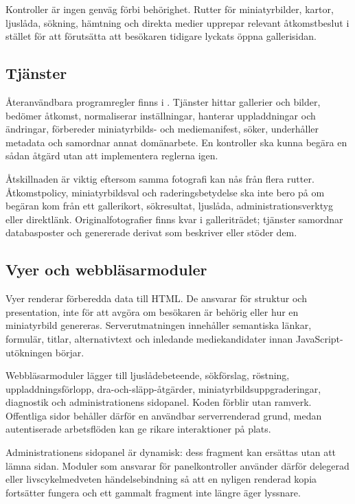\documentclass[11pt,a4paper]{article}
\newcommand{\filepath}[1]{\path{#1}}
\begin{document}
Kontroller är ingen genväg förbi behörighet. Rutter för miniatyrbilder, kartor,
ljuslåda, sökning, hämtning och direkta medier upprepar relevant åtkomstbeslut i
stället för att förutsätta att besökaren tidigare lyckats öppna gallerisidan.

\subsection{Tjänster}

Återanvändbara programregler finns i \filepath{app/services/}. Tjänster hittar
gallerier och bilder, bedömer åtkomst, normaliserar inställningar, hanterar
uppladdningar och ändringar, förbereder miniatyrbilds- och mediemanifest, söker,
underhåller metadata och samordnar annat domänarbete. En kontroller ska kunna
begära en sådan åtgärd utan att implementera reglerna igen.

Åtskillnaden är viktig eftersom samma fotografi kan nås från flera rutter.
Åtkomstpolicy, miniatyrbildsval och raderingsbetydelse ska inte bero på om
begäran kom från ett gallerikort, sökresultat, ljuslåda, administrationsverktyg
eller direktlänk. Originalfotografier finns kvar i galleriträdet; tjänster
samordnar databasposter och genererade derivat som beskriver eller stöder dem.

\subsection{Vyer och webbläsarmoduler}

Vyer renderar förberedda data till HTML. De ansvarar för struktur och
presentation, inte för att avgöra om besökaren är behörig eller hur en
miniatyrbild genereras. Serverutmatningen innehåller semantiska länkar,
formulär, titlar, alternativtext och inledande mediekandidater innan
JavaScript-utökningen börjar.

Webbläsarmoduler lägger till ljuslådebeteende, sökförslag, röstning,
uppladdningsförlopp, dra-och-släpp-åtgärder, miniatyrbildsuppgraderingar,
diagnostik och administrationens sidopanel. Koden förblir utan ramverk.
Offentliga sidor behåller därför en användbar serverrenderad grund, medan
autentiserade arbetsflöden kan ge rikare interaktioner på plats.

Administrationens sidopanel är dynamisk: dess fragment kan ersättas utan att
lämna sidan. Moduler som ansvarar för panelkontroller använder därför delegerad
eller livscykelmedveten händelsebindning så att en nyligen renderad kopia
fortsätter fungera och ett gammalt fragment inte längre äger lyssnare.
\end{document}
